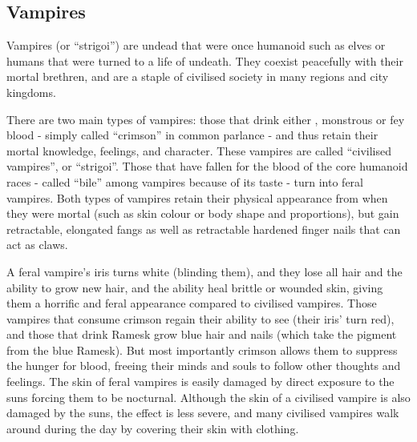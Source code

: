 \ifimages
\clearpage
{}
\clearpage
\fi

\subsection{Vampires}
\label{sec:Vampires}

Vampires (or ``strigoi'') are undead that were once humanoid such as elves or
humans that were turned to a life of undeath. They coexist peacefully with
their mortal brethren, and are a staple of civilised society in many regions
and city kingdoms.

There are two main types of vampires: those that drink either
, monstrous or fey blood - simply called ``crimson'' in
common parlance - and thus retain their mortal knowledge, feelings, and
character. These vampires are called ``civilised vampires'', or
``strigoi''. Those that have fallen for the blood of the core humanoid races -
called ``bile'' among vampires because of its taste - turn into feral vampires.
Both types of vampires retain their physical appearance from when they were
mortal (such as skin colour or body shape and proportions), but gain
retractable, elongated fangs as well as retractable hardened finger nails that
can act as claws.

A feral vampire's iris turns white (blinding them), and they lose all hair and
the ability to grow new hair, and the ability heal brittle or wounded skin,
giving them a horrific and feral appearance compared to civilised
vampires. Those vampires that consume crimson regain their ability to see
(their iris' turn red), and those that drink Ramesk grow blue hair and nails
(which take the pigment from the blue Ramesk). But most importantly crimson
allows them to suppress the hunger for blood, freeing their minds and souls to
follow other thoughts and feelings. The skin of feral vampires is easily
damaged by direct exposure to the suns forcing them to be nocturnal. Although
the skin of a civilised vampire is also damaged by the suns, the effect is
less severe, and many civilised vampires walk around during the day by
covering their skin with clothing.

